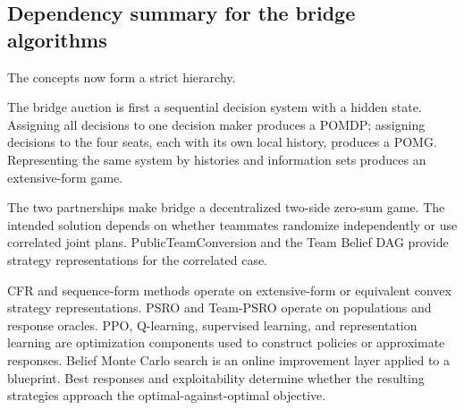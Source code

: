 \subsection{Dependency summary for the bridge algorithms}

The concepts now form a strict hierarchy.

The bridge auction is first a sequential decision system with a hidden state. Assigning all decisions to one decision maker produces a POMDP; assigning decisions to the four seats, each with its own local history, produces a POMG. Representing the same system by histories and information sets produces an extensive-form game.

The two partnerships make bridge a decentralized two-side zero-sum game. The intended solution depends on whether teammates randomize independently or use correlated joint plans. PublicTeamConversion and the Team Belief DAG provide strategy representations for the correlated case.

CFR and sequence-form methods operate on extensive-form or equivalent convex strategy representations. PSRO and Team-PSRO operate on populations and response oracles. PPO, Q-learning, supervised learning, and representation learning are optimization components used to construct policies or approximate responses. Belief Monte Carlo search is an online improvement layer applied to a blueprint. Best responses and exploitability determine whether the resulting strategies approach the optimal-against-optimal objective.